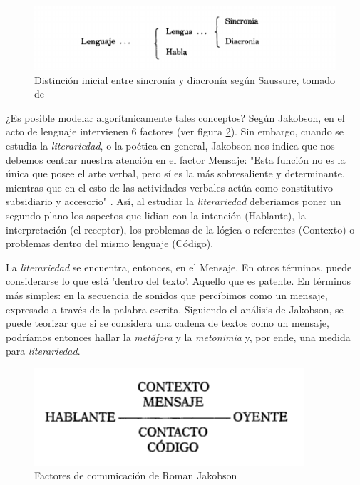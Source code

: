 \documentclass[12pt,letterpaper,twoside]{article}
\begin{document}
\begin{figure}[htbp]
\centering
\includegraphics[width=.9\linewidth]{./assets/clasificacion_saussure.png}
\caption{\label{fig:org8ebdf36}Distinción inicial entre sincronía y diacronía según Saussure, tomado de \cite{alonso1945curso}}
\end{figure}

¿Es posible modelar algorítmicamente tales conceptos? Según Jakobson,
en el acto de lenguaje intervienen 6 factores (ver figura
\ref{fig:orgec9d97c}). Sin embargo, cuando se estudia la \emph{literariedad},
o la poética en general, Jakobson nos indica que nos debemos centrar
nuestra atención en el factor Mensaje: "Esta función no es la única
que posee el arte verbal, pero sí es la más sobresaliente y
determinante, mientras que en el esto de las actividades verbales
actúa como constitutivo subsidiario y accesorio" \cite{jakobson1981linguistica}.
Así, al estudiar la \emph{literariedad} deberiamos poner un segundo plano
los aspectos que lidian con la intención (Hablante), la interpretación
(el receptor), los problemas de la lógica o referentes (Contexto) o
problemas dentro del mismo lenguaje (Código). 

La \emph{literariedad} se encuentra, entonces, en el Mensaje. En otros
términos, puede considerarse lo que está 'dentro del texto'. Aquello
que es patente.  En términos más simples: en la secuencia de sonidos
que percibimos como un mensaje, expresado a través de la palabra
escrita. Siguiendo el análisis de Jakobson, se puede teorizar que
si se considera una cadena de textos como un mensaje, podríamos
entonces hallar la \emph{metáfora} y la \emph{metonimia} y, por ende,
una medida para \emph{literariedad}.


\begin{figure}[htbp]
\centering
\includegraphics[width=.9\linewidth]{./assets/factores_comunicacion.png}
\caption{\label{fig:orgec9d97c}Factores de comunicación de Roman Jakobson \cite{jakobson1981linguistica}}
\end{figure}
\end{document}
